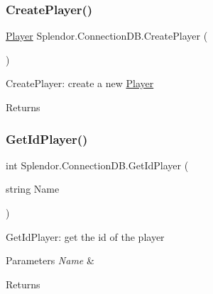 \subsubsection{\texorpdfstring{Create\+Player()}{CreatePlayer()}}
{\footnotesize\ttfamily \hyperlink{class_splendor_1_1_player}{Player} Splendor.\+Connection\+D\+B.\+Create\+Player (\begin{DoxyParamCaption}{ }\end{DoxyParamCaption})}



Create\+Player\+: create a new \hyperlink{class_splendor_1_1_player}{Player} 

\begin{DoxyReturn}{Returns}

\end{DoxyReturn}
\mbox{\label{class_splendor_1_1_connection_d_b_a40b90ca2728a9ee2aa851f946c46181e}} 
\subsubsection{\texorpdfstring{Get\+Id\+Player()}{GetIdPlayer()}}
{\footnotesize\ttfamily int Splendor.\+Connection\+D\+B.\+Get\+Id\+Player (\begin{DoxyParamCaption}\item[{string}]{Name }\end{DoxyParamCaption})}



Get\+Id\+Player\+: get the id of the player 


\begin{DoxyParams}{Parameters}
{\em Name} & \\
\hline
\end{DoxyParams}
\begin{DoxyReturn}{Returns}

\end{DoxyReturn}
\mbox{\label{class_splendor_1_1_connection_d_b_abcd995d0fa97aa5f3a40ff5c23b22502}} 
